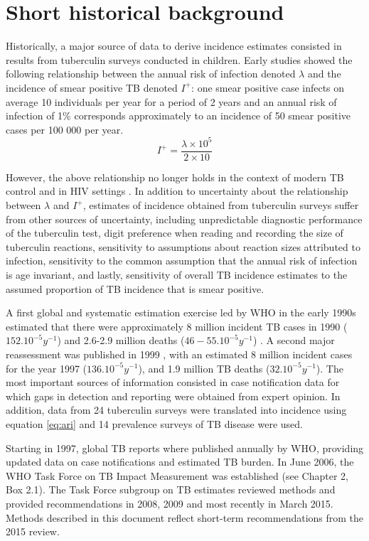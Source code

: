 \section{Short historical background}

Historically, a major source of data to derive incidence estimates consisted in results from tuberculin surveys conducted in children\cite{Styblo1985}. Early studies showed  the following relationship between the annual risk of infection denoted $\lambda$ and the incidence of smear positive TB denoted $I^+$: one smear positive case infects on average 10 individuals per year for a period of 2 years and an annual risk of infection of 1\% corresponds approximately to an incidence of 50 smear positive cases per 100 000 per year.
\begin{equation}
\label{eq:ari}
I^+ = \frac{\lambda \times 10^5}{2 \times 10}
\end{equation}

However, the above relationship no longer holds in the context of modern TB control and in HIV settings \cite{18235886}. In addition to uncertainty about the relationship between $\lambda$ and $I^+$, estimates of incidence obtained from tuberculin surveys suffer from other sources of uncertainty, including unpredictable diagnostic performance of the tuberculin test, digit preference when reading and recording the size of tuberculin reactions, sensitivity to assumptions about reaction sizes attributed to infection, sensitivity to the common assumption that the annual risk of infection is age invariant, and lastly, sensitivity of overall TB incidence estimates to the assumed proportion of TB incidence that is smear positive. 

A first global and systematic estimation exercise led by WHO in the early 1990s estimated that there were approximately 8 million incident TB cases in 1990 ($152.10^{-5} y^{-1}$) and 2.6-2.9 million deaths ($46-55.10^{-5} y^{-1}$) \cite{1600578}. A second major reassessment was published in 1999 \cite{10517722}, with an estimated 8 million incident  cases for the year 1997 ($136.10^{-5} y^{-1}$), and 1.9 million TB deaths ($32.10^{-5} y^{-1}$). The most important sources of information consisted in case notification data for which gaps in detection and reporting were obtained from expert opinion. In addition, data from 24 tuberculin surveys were translated into incidence using equation \ref{eq:ari} and 14 prevalence surveys of TB disease were used.

Starting in 1997, global TB reports where published annually by WHO, providing updated data on case notifications and estimated TB burden. In June 2006, the WHO Task Force on TB Impact Measurement was established \cite{18201929} (see Chapter 2, Box 2.1). The Task Force subgroup on TB estimates reviewed methods and provided recommendations in 2008, 2009 and most recently in March 2015. Methods described in this document reflect short-term recommendations from the 2015 review. 




  
  
  
  
  
  
  
  
  
  
  